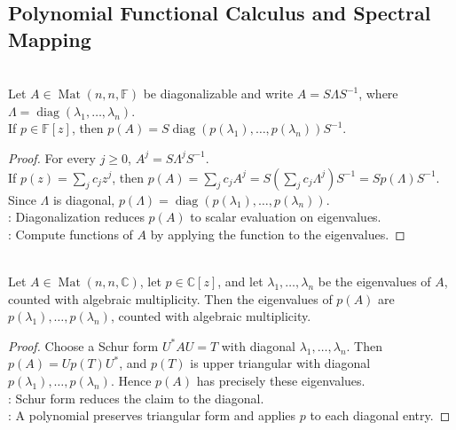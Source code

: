 \subsection{Polynomial Functional Calculus and Spectral Mapping}

\begin{theorem} \label{thm:polynomial-functional-calculus-diagonalizable-matrix} \\
Let $A\in\operatorname{Mat}(n,n,\mathbb{F})$ be diagonalizable and write $A=S\Lambda S^{-1}$, where $\Lambda=\operatorname{diag}(\lambda_1,\ldots,\lambda_n)$.\\
If $p\in\mathbb{F}[z]$, then $p(A)=S\operatorname{diag}(p(\lambda_1),\ldots,p(\lambda_n))S^{-1}$.
\begin{proof}
For every $j\geq0$, $A^j=S\Lambda^jS^{-1}$.\\
If $p(z)=\sum_j c_jz^j$, then $p(A)=\sum\limits_j c_jA^j =S\left(\sum\limits_j c_j\Lambda^j\right)S^{-1} =S p(\Lambda) S^{-1}$.\\
Since $\Lambda$ is diagonal, $p(\Lambda)=\operatorname{diag}(p(\lambda_1),\ldots,p(\lambda_n))$.\\
: Diagonalization reduces $p(A)$ to scalar evaluation on eigenvalues.\\
: Compute functions of $A$ by applying the function to the eigenvalues.
\end{proof}
\end{theorem}

\begin{proposition} \label{prop:eigenvalues-of-polynomial-in-matrix} \\
Let $A\in\operatorname{Mat}(n,n,\mathbb{C})$, let $p\in\mathbb{C}[z]$, and let $\lambda_1,\ldots,\lambda_n$ be the eigenvalues of $A$, counted with algebraic multiplicity. Then the eigenvalues of $p(A)$ are $p(\lambda_1),\ldots,p(\lambda_n)$, counted with algebraic multiplicity.
\begin{proof}
Choose a Schur form $U^*AU=T$ with diagonal $\lambda_1,\ldots,\lambda_n$. Then $p(A)=Up(T)U^*$, and $p(T)$ is upper triangular with diagonal $p(\lambda_1),\ldots,p(\lambda_n)$. Hence $p(A)$ has precisely these eigenvalues.\\
: Schur form reduces the claim to the diagonal.\\
: A polynomial preserves triangular form and applies $p$ to each diagonal entry.
\end{proof}
\end{proposition}

